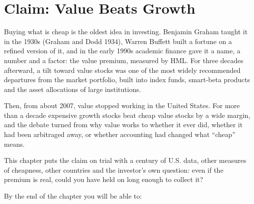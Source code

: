 \makeatletter
{}
\makeatother

\chapter{Claim: Value Beats Growth}
\label{ch:08}

Buying what is cheap is the oldest idea in investing. Benjamin Graham taught it in the 1930s (Graham and Dodd 1934), Warren Buffett built a fortune on a refined version of it, and in the early 1990s academic finance gave it a name, a number and a factor: the value premium, measured by HML. For three decades afterward, a tilt toward value stocks was one of the most widely recommended departures from the market portfolio, built into index funds, smart-beta products and the asset allocations of large institutions.

Then, from about 2007, value stopped working in the United States. For more than a decade expensive growth stocks beat cheap value stocks by a wide margin, and the debate turned from why value works to whether it ever did, whether it had been arbitraged away, or whether accounting had changed what ``cheap'' means.

This chapter puts the claim on trial with a century of U.S. data, other measures of cheapness, other countries and the investor's own question: even if the premium is real, could you have held on long enough to collect it?

By the end of the chapter you will be able to:

